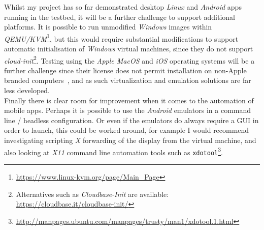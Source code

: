 \documentclass[
    author={Jacob Daniel Halsey},
    supervisor={Prof. Awais Rashid},
    degree={BSc},
    title={Building a Testbed for Evaluating Privacy Enhancing Technologies  (PETs)},
    subtitle={},
    type={software development},
    year={2021}
]{dissertation}
\begin{document}
Whilst my project has so far demonstrated desktop \emph{Linux} and \emph{Android} apps running
in the testbed, it will be a further challenge to support additional platforms. It is possible
to run unmodified \emph{Windows} images within \emph{QEMU/KVM}\footnote{\url{https://www.linux-kvm.org/page/Main_Page}},
but this would require substantial modifications to support automatic initialisation of \emph{Windows}
virtual machines, since they do not support \emph{cloud-init}\footnote{Alternatives such as 
\emph{Cloudbase-Init} are available: \url{https://cloudbase.it/cloudbase-init/}}. Testing using the 
\emph{Apple MacOS} and \emph{iOS} operating systems will be a further challenge since their license
does not permit installation on non-Apple branded computers~\cite[Part 2, Section I]{yosemite},
and as such virtualization and emulation solutions are far less developed. \\

Finally there is clear room for improvement when it comes to the automation of mobile apps. 
Perhaps it is possible to use the \emph{Android} emulators in a command line / headless configuration.
Or even if the emulators do always require
a GUI in order to launch, this could be worked around, for example I would recommend
investigating scripting \emph{X} forwarding of the display from the virtual machine, and also
looking at \emph{X11} command line automation tools such as
\texttt{xdotool}\footnote{\url{http://manpages.ubuntu.com/manpages/trusty/man1/xdotool.1.html}}.

\backmatter
\printbibliography
\end{document}

